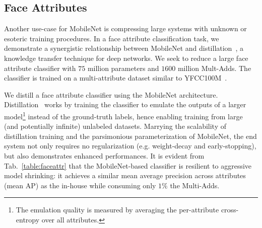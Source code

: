 \documentclass[10pt,twocolumn,letterpaper]{article}
\begin{document}
\subsection{Face Attributes}
Another use-case for MobileNet is compressing large systems with unknown or esoteric training procedures. In a face attribute classification task, we demonstrate a synergistic relationship between MobileNet and distillation~\cite{hinton2015distilling}, a knowledge transfer technique for deep networks. We seek to reduce a large face attribute classifier with $75$ million parameters and $1600$ million Mult-Adds. The classifier is trained on a multi-attribute dataset similar to YFCC100M~\cite{thomee2016yfcc100m}.

We distill a face attribute classifier using the MobileNet architecture. Distillation~\cite{hinton2015distilling} works by training the classifier to emulate the outputs of a larger model\footnote{The emulation quality is measured by averaging the per-attribute cross-entropy over all attributes.} instead of the ground-truth labels, hence enabling training from large (and potentially infinite) unlabeled datasets. Marrying the scalability of distillation training and the parsimonious parameterization of MobileNet, the end system not only requires no regularization (e.g. weight-decay and early-stopping), but also demonstrates enhanced performances. It is evident from Tab.~\ref{table:faceattr} that the MobileNet-based classifier is resilient to aggressive model shrinking: it achieves a similar mean average precision across attributes (mean AP) as the in-house while consuming only $1\%$ the Multi-Adds. 

\begin{table}[t]
\setlength\tabcolsep{3pt}
  \caption{Face attribute classification using the MobileNet architecture. Each row corresponds to a different hyper-parameter setting (width multiplier $\alpha$ and image resolution).} %
\centering %
\end{table}
\end{document}
